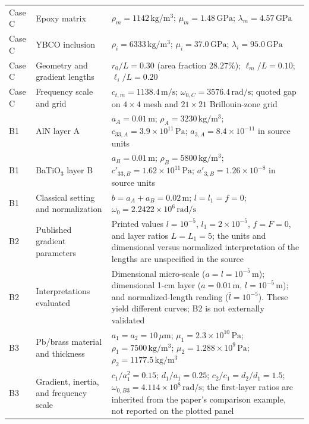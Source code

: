 \begin{xltabular}{\textwidth}{@{}l p{3.2cm} Y@{}}
Case C & Epoxy matrix & $\rho_m=1142\,\mathrm{kg/m^3}$; $\mu_m=1.48\,\mathrm{GPa}$; $\lambda_m=4.57\,\mathrm{GPa}$ \cite{zhanwei2010} \\
Case C & YBCO inclusion & $\rho_i=6333\,\mathrm{kg/m^3}$; $\mu_i=37.0\,\mathrm{GPa}$; $\lambda_i=95.0\,\mathrm{GPa}$ \cite{zhanwei2010} \\
Case C & Geometry and gradient lengths & $r_0/L=0.30$ (area fraction $28.27\%$); $\ell_m/L=0.10$; $\ell_i/L=0.20$ \\
Case C & Frequency scale and grid & $c_{t,m}=1138.4\,\mathrm{m/s}$; $\omega_{0,C}=3576.4\,\mathrm{rad/s}$; quoted gap on $4\times4$ mesh and $21\times21$ Brillouin-zone grid \\
B1 & AlN layer A & $a_A=0.01\,\mathrm{m}$; $\rho_A=3230\,\mathrm{kg/m^3}$; $c_{33,A}=3.9\times10^{11}\,\mathrm{Pa}$; $a_{3,A}=8.4\times10^{-11}$ in source units \cite{li2024anchorB} \\
B1 & BaTiO$_3$ layer B & $a_B=0.01\,\mathrm{m}$; $\rho_B=5800\,\mathrm{kg/m^3}$; $c'_{33,B}=1.62\times10^{11}\,\mathrm{Pa}$; $a'_{3,B}=1.26\times10^{-8}$ in source units \cite{li2024anchorB} \\
B1 & Classical setting and normalization & $b=a_A+a_B=0.02\,\mathrm{m}$; $l=l_1=f=0$; $\omega_0=2.2422\times10^6\,\mathrm{rad/s}$ \\
B2 & Published gradient parameters & Printed values $l=10^{-5}$, $l_1=2\times10^{-5}$, $f=F=0$, and layer ratios $L=L_1=5$; the units and dimensional versus normalized interpretation of the lengths are unspecified in the source \cite{li2024anchorB} \\
B2 & Interpretations evaluated & Dimensional micro-scale ($a=l=10^{-5}\,\mathrm{m}$); dimensional 1-cm layer ($a=0.01\,\mathrm{m}$, $l=10^{-5}\,\mathrm{m}$); and normalized-length reading ($\bar l=10^{-5}$). These yield different curves; B2 is not externally validated \\
B3 & Pb/brass material and thickness & $a_1=a_2=10\,\mu\mathrm{m}$; $\mu_1=2.3\times10^{10}\,\mathrm{Pa}$; $\rho_1=7500\,\mathrm{kg/m^3}$; $\mu_2=1.288\times10^9\,\mathrm{Pa}$; $\rho_2=1177.5\,\mathrm{kg/m^3}$ \cite{li2023anchorA} \\
B3 & Gradient, inertia, and frequency scale & $c_1/a_1^2=0.15$; $d_1/a_1=0.25$; $c_2/c_1=d_2/d_1=1.5$; $\omega_{0,B3}=4.114\times10^8\,\mathrm{rad/s}$; the first-layer ratios are inherited from the paper's comparison example, not reported on the plotted panel \\
\end{xltabular}
